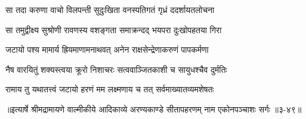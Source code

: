\twolineshloka
{सा तदा करुणा वाचो विलपन्ती सुदुःखिता}
{वनस्पतिगतं गृध्रं ददर्शायतलोचना} %

\twolineshloka
{सा तमुद्वीक्ष्य सुश्रोणी रावणस्य वशङ्गता}
{समाक्रन्दद् भयपरा दुःखोपहतया गिरा} %

\twolineshloka
{जटायो पश्य मामार्य ह्रियमाणामनाथवत्}
{अनेन राक्षसेन्द्रेणाकरुणं पापकर्मणा} %

\twolineshloka
{नैष वारयितुं शक्यस्त्वया क्रूरो निशाचरः}
{सत्ववाञ्जितकाशी च सायुधश्चैव दुर्मतिः} %

\twolineshloka
{रामाय तु यथातत्त्वं जटायो हरणं मम}
{लक्ष्मणाय च तत् सर्वमाख्यातव्यमशेषतः} %


॥इत्यार्षे श्रीमद्रामायणे वाल्मीकीये आदिकाव्ये अरण्यकाण्डे सीतापहरणम् नाम एकोनपञ्चाशः सर्गः ॥३-४९॥
